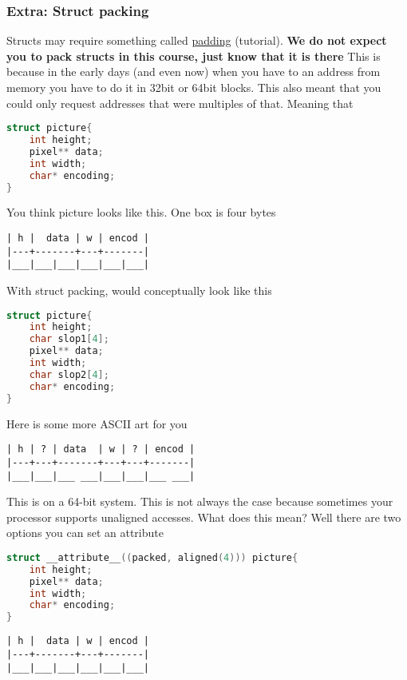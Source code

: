 \subsubsection{Extra: Struct packing}

Structs may require something called \href{http://www.catb.org/esr/structure-packing/}{padding} (tutorial).
\textbf{We do not expect you to pack structs in this course, just know that it is there} This is because in the early days (and even now) when you have to an address from memory you have to do it in 32bit or 64bit blocks.
This also meant that you could only request addresses that were multiples of that.
Meaning that

\begin{lstlisting}[language=C]
struct picture{
    int height;
    pixel** data;
    int width;
    char* encoding;
}
\end{lstlisting}
You think picture looks like this. One box is four bytes

\begin{verbatim}
| h |  data | w | encod |
|---+-------+---+-------|
|___|___|___|___|___|___|
\end{verbatim}

With struct packing, would conceptually look like this

\begin{lstlisting}[language=C]
struct picture{
    int height;
    char slop1[4];
    pixel** data;
    int width;
    char slop2[4];
    char* encoding;
}
\end{lstlisting}

Here is some more ASCII art for you

\begin{verbatim}
| h | ? | data  | w | ? | encod |
|---+---+-------+---+---+-------|
|___|___|___ ___|___|___|___ ___|
\end{verbatim}

This is on a 64-bit system. This is not always the case because
sometimes your processor supports unaligned accesses. What does this mean? Well there are two options you can set an attribute

\begin{lstlisting}[language=C]
struct __attribute__((packed, aligned(4))) picture{
    int height;
    pixel** data;
    int width;
    char* encoding;
}
\end{lstlisting}

\begin{verbatim}
| h |  data | w | encod |
|---+-------+---+-------|
|___|___|___|___|___|___|
\end{verbatim}

